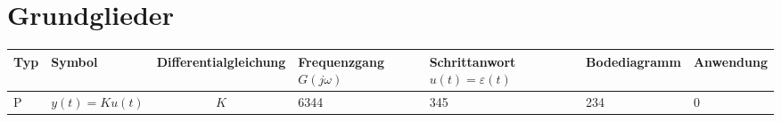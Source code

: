 \section{Grundglieder }

\begin{table}[h!]
	\raggedright
	\begin{tabulary}{1\textwidth}{|m{5mm}|m{2cm}|C|b{3cm}|b{3cm}|b{3cm}|L|} 
		\hline
		Typ & Symbol & Differentialgleichung & Frequenzgang \newline $G(j \omega)$ & Schrittanwort $u(t)=\varepsilon(t)$ & Bodediagramm & Anwendung \\ [0.5ex] 
		\hline\hline
		P & $y(t)=K u(t)$ & $K$ & 6344 & 345 & 234 & 0\\ [1ex] 
		\hline
	\end{tabulary}
\end{table}
